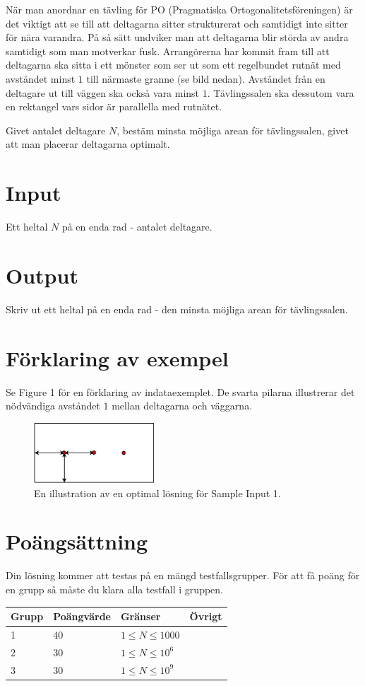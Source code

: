 När man anordnar en tävling för PO (Pragmatiska Ortogonalitetsföreningen) är
det viktigt att se till att deltagarna sitter strukturerat och samtidigt inte
sitter för nära varandra. På så sätt undviker man att
deltagarna blir störda av andra samtidigt som man motverkar fusk.
Arrangörerna har kommit fram till att deltagarna ska sitta i ett mönster som ser ut
som ett regelbundet rutnät med avståndet minst $1$ till närmaste granne (se bild nedan).
Avståndet från en deltagare ut till väggen ska också vara minst $1$.
Tävlingssalen ska dessutom vara en rektangel vars sidor är parallella med rutnätet.

Givet antalet deltagare $N$, bestäm minsta möjliga arean för tävlingssalen, givet att man placerar
deltagarna optimalt.

\section*{Input}
Ett heltal $N$ på en enda rad - antalet deltagare.

\section*{Output}
Skriv ut ett heltal på en enda rad - den minsta möjliga arean för tävlingssalen.

\section*{Förklaring av exempel}
Se Figure 1 för en förklaring av indataexemplet. De svarta pilarna illustrerar det nödvändiga avståndet
$1$ mellan deltagarna och väggarna.
\begin{figure}[ht!]
\centering
\includegraphics[width=0.4\textwidth]{tavlingssal.png}
\caption{En illustration av en optimal lösning för Sample Input 1.}
\label{overflow}
\end{figure}


\section*{Poängsättning}
Din lösning kommer att testas på en mängd testfallsgrupper. För att få poäng
för en grupp så måste du klara alla testfall i gruppen.

\begin{tabular}{| l | l | l | l |}
\hline
Grupp & Poängvärde & Gränser & Övrigt\\ \hline
1     & 40         & $ 1 \le N \le 1000 $ & \\ \hline
2     & 30         & $ 1 \le N \le 10^6 $ & \\ \hline
3     & 30         & $ 1 \le N \le 10^9 $ & \\ \hline
\end{tabular}
